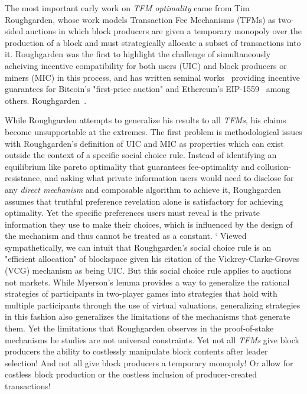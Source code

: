 \documentclass[sigconf,anonymous]{aamas}
\begin{document}
The most important early work on \textit{TFM optimality} came from Tim Roughgarden\citet{roughgarden2021,roughgarden2024transaction}, whose work models Transaction Fee Mechanisms (TFMs) as two-sided auctions in which block producers are given a temporary monopoly over the production of a block and must strategically allocate a subset of transactions into it. Roughgarden was the first to highlight the challenge of simultaneously acheiving incentive compatibility for both users (UIC) and block producers or miners (MIC) in this process, and has written seminal works~\cite {roughgarden2021,roughgarden2024transaction} providing incentive guarantees for Bitcoin's "first-price auction" and Ethereum's EIP-1559~\cite{buterin2019eip} among others. Roughgarden~\cite{roughgarden2021,roughgarden2024transaction}.















While Roughgarden attempts to generalize his results to all \textit{TFMs}, his claims become unsupportable at the extremes. The first problem is methodological issues with Roughgarden's definition of UIC and MIC as properties which can exist outside the context of a specific social choice rule. Instead of identifying an equilibrium like pareto optimality that guarantees fee-optimality and collusion-resistance, and asking what private information users would need to disclose for any \textit{direct mechanism} and composable algorithm to achieve it, Roughgarden assumes that truthful preference revelation alone is satisfactory for achieving optimality. Yet the specific preferences users must reveal is the private information they use to make their choices, which is influenced by the design of the mechanism and thus cannot be treated as a constant. 
`
Viewed sympathetically, we can intuit that Roughgarden's social choice rule is an "efficient allocation" of blockspace given his citation of the Vickrey-Clarke-Groves (VCG) mechanism as being UIC. But this social choice rule applies to auctions not markets. While Myerson's lemma provides a way to generalize the rational strategies of participants in two-player games into strategies that hold with multiple participants through the use of virtual valuations, generalizing strategies in this fashion also generalizes the limitations of the mechanisms that generate them. Yet the limitations that Roughgarden observes in the proof-of-stake mechanisms he studies are not universal constraints. Yet not all \textit{TFMs} give block producers the ability to costlessly manipulate block contents after leader selection! And not all give block producers a temporary monopoly! Or allow for costless block production or the costless inclusion of producer-created transactions!
\end{document}
